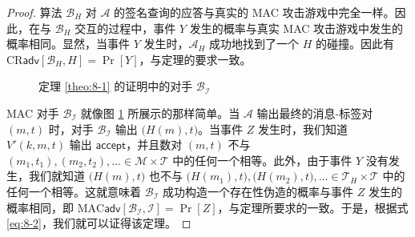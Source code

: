 \begin{proof}
\vspace{5pt}

\noindent
算法 $\mathcal{B}_H$ 对 $\mathcal{A}$ 的签名查询的应答与真实的 MAC 攻击游戏中完全一样。因此，在与 $\mathcal{B}_H$ 交互的过程中，事件 $Y$ 发生的概率与真实 MAC 攻击游戏中发生的概率相同。显然，当事件 $Y$ 发生时，$\mathcal{A}_H$ 成功地找到了一个 $H$ 的碰撞。因此有 $\mathrm{CR}\mathsf{adv}[\mathcal{B}_H,H]=\Pr[Y]$，与定理的要求一致。

\begin{figure}
	\centering
	
	\caption{定理 \ref{theo:8-1} 的证明中的对手 $\mathcal{B}_\mathcal{I}$}
	\label{fig:8-4}
\end{figure}

MAC 对手 $\mathcal{B}_\mathcal{I}$ 就像图 \ref{fig:8-4} 所展示的那样简单。当 $\mathcal{A}$ 输出最终的消息-标签对 $(m,t)$ 时，对手 $\mathcal{B}_\mathcal{I}$ 输出 $\big(H(m),t\big)$。当事件 $Z$ 发生时，我们知道 $V'(k,m,t)$ 输出 $\mathsf{accept}$，并且数对 $(m,t)$ 不与 $(m_1,t_1),(m_2,t_2),\allowbreak\dots\in\mathcal{M}\times\mathcal{T}$ 中的任何一个相等。此外，由于事件 $Y$ 没有发生，我们就知道 $\big(H(m),t\big)$ 也不与 $\big(H(m_1),t\big),\allowbreak\big(H(m_2),t\big),\allowbreak\dots\in\mathcal{T}_H\times\mathcal{T}$ 中的任何一个相等。这就意味着 $\mathcal{B}_\mathcal{I}$ 成功构造一个存在性伪造的概率与事件 $Z$ 发生的概率相同，即 $\mathrm{MAC}\mathsf{adv}[\mathcal{B}_\mathcal{I},\mathcal{I}]=\Pr[Z]$，与定理所要求的一致。于是，根据式 \ref{eq:8-2}，我们就可以证得该定理。
\end{proof}